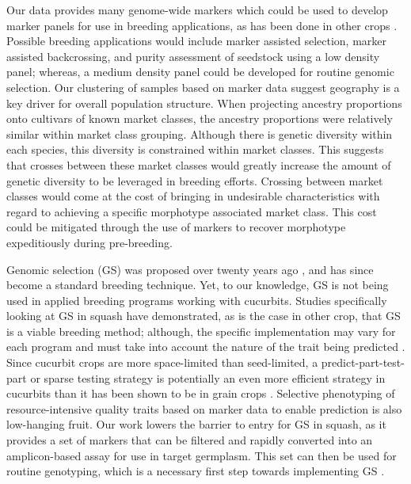 \documentclass[utf8]{FrontiersinHarvard} %
\begin{document}
Our data provides many genome-wide markers which could be used to develop marker panels for use in breeding applications, as has been done in other crops \citep{}. Possible breeding applications would include marker assisted selection, marker assisted backcrossing, and purity assessment of seedstock using a low density panel; whereas, a medium density panel could be developed for routine genomic selection. Our clustering of samples based on marker data suggest geography is a key driver for overall population structure. When projecting ancestry proportions onto cultivars of known market classes, the ancestry proportions were relatively similar within market class grouping. Although there is genetic diversity within each species, this diversity is constrained within market classes. This suggests that crosses between these market classes would greatly increase the amount of genetic diversity to be leveraged in breeding efforts. Crossing between market classes would come at the cost of bringing in undesirable characteristics with regard to achieving a specific morphotype associated market class. This cost could be mitigated through the use of markers to recover morphotype expeditiously during pre-breeding. 

Genomic selection (GS) was proposed over twenty years ago \citep{}, and has since become a standard breeding technique. Yet, to our knowledge, GS is not being used in applied breeding programs working with cucurbits. Studies specifically looking at GS in squash have demonstrated, as is the case in other crop, that GS is a viable breeding method; although, the specific implementation may vary for each program and must take into account the nature of the trait being predicted \citep{}. Since cucurbit crops are more space-limited than seed-limited, a predict-part-test-part or sparse testing strategy is potentially an even more efficient strategy in cucurbits than it has been shown to be in grain crops \citep{}. Selective phenotyping of resource-intensive quality traits based on marker data to enable prediction is also low-hanging fruit. Our work lowers the barrier to entry for GS in squash, as it provides a set of markers that can be filtered and rapidly converted into an amplicon-based assay for use in target germplasm. This set can then be used for routine genotyping, which is a necessary first step towards implementing GS \citep{}.
\end{document}
